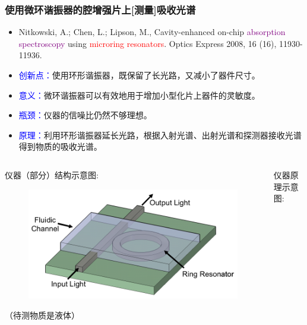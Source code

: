 \begin{frame}[c]
    \frametitle{使用微环谐振器的腔增强片上[测量]吸收光谱}
    \begin{itemize}
        \item Nitkowski, A.;  Chen, L.; Lipson, M., Cavity-enhanced on-chip \textcolor{purple}{absorption spectroscopy} using \textcolor{red}{microring resonators}. Optics Express 2008, 16 (16), 11930-11936.
        \item \textcolor{blue}{创新点：}使用环形谐振器，既保留了长光路，又减小了器件尺寸。
        \item \textcolor{blue}{意义：}微环谐振器可以有效地用于增加小型化片上器件的灵敏度。
        \item \textcolor{blue}{瓶颈：}仪器的信噪比仍然不够理想。
        \item \textcolor{blue}{原理：}利用环形谐振器延长光路，根据入射光谱、出射光谱和探测器接收光谱得到物质的吸收光谱。
    \end{itemize}
    \begin{columns}
        \begin{column}{.5\textwidth}
            仪器（部分）结构示意图:
            \begin{figure}[H] %
                \centering %
                \includegraphics[width=1.\textwidth]{figures/Cavity-enhanced on-chip absorption spectroscopy using microring resonators_1.png} %
            \end{figure}
            （待测物质是液体）
        \end{column}
        \begin{column}{.5\textwidth}
            仪器原理示意图:
            \begin{figure}[H] %
                \centering %

\end{figure}
\end{column}
\end{columns}
\end{frame}
